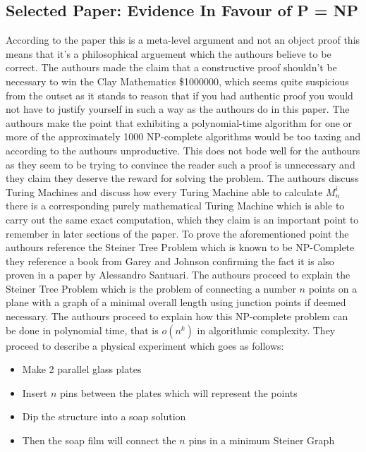 \documentclass{report}
\begin{document}
\subsection{Selected Paper: Evidence In Favour of P = NP}
According to the paper this is a meta-level argument and not an object proof\cite{PVsNPSolved} this means that it's a philosophical arguement which the authours believe to be correct.  The authours made the claim that a constructive proof shouldn't be necessary to win the Clay Mathematics \$1000000\cite{Millennium}, which seems quite suspicious from the outset as it stands to reason that if you had authentic proof you would not have to justify yourself in such a way as the authours do in this paper\cite{PVsNPSolved}.  The authours make the point that exhibiting a polynomial-time algorithm for one or more of the approximately 1000 NP-complete algorithms would be too taxing and according to the authours unproductive\cite{PVsNPSolved}.  This does not bode well for the authours as they seem to be trying to convince the reader such a proof is unnecessary and they claim they deserve the reward for solving the problem\cite{PVsNPSolved}.  The authours discuss Turing Machines and discuss how every Turing Machine able to calculate $M^i_n$ there is a corresponding purely mathematical Turing Machine which is able to carry out the same exact computation, which they claim is an important point to remember in later sections of the paper.  To prove the aforementioned point the authours reference the Steiner Tree Problem which is known to be NP-Complete they reference a book from Garey and Johnson confirming the fact\cite{GaeryJohnson} it is also proven in a paper by Alessandro Santuari\cite{Steiner}.  The authours proceed to explain the Steiner Tree Problem which is the problem of connecting a number $n$ points on a plane with a graph of a minimal overall length using junction points if deemed necessary\cite{Steiner}.  The authours proceed to explain how this NP-complete problem can be done in polynomial time, that is $o(n^k)$ in algorithmic complexity.  They proceed to describe a physical experiment\cite{PVsNPSolved} which goes as follows:
\begin{itemize}
  \item Make 2 parallel glass plates
  \item Insert $n$ pins between the plates which will represent the points
  \item Dip the structure into a soap solution
  \item Then the soap film will connect the $n$ pins in a minimum Steiner Graph
\end{itemize}
\end{document}
